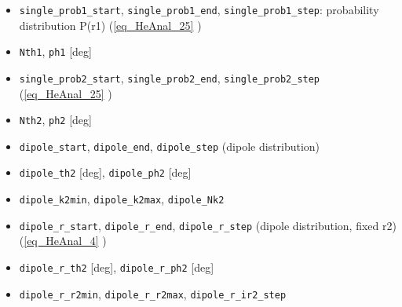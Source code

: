 \begin{itemize}
\item \verb`single_prob1_start`, \verb`single_prob1_end`, \verb`single_prob1_step`: probability distribution P(\vec r1) (\autoref{eq_HeAnal_25} )
\item \verb`Nth1`, \verb`ph1` [deg]

\item \verb`single_prob2_start`, \verb`single_prob2_end`, \verb`single_prob2_step` (\autoref{eq_HeAnal_25} )
\item \verb`Nth2`, \verb`ph2` [deg]

\item \verb`dipole_start`, \verb`dipole_end`, \verb`dipole_step` (dipole distribution)
\item \verb`dipole_th2` [deg], \verb`dipole_ph2` [deg]
\item \verb`dipole_k2min`, \verb`dipole_k2max`, \verb`dipole_Nk2`

\item \verb`dipole_r_start`, \verb`dipole_r_end`, \verb`dipole_r_step` (dipole distribution, fixed r2) (\autoref{eq_HeAnal_4} )
\item \verb`dipole_r_th2` [deg], \verb`dipole_r_ph2` [deg]
\item \verb`dipole_r_r2min`, \verb`dipole_r_r2max`, \verb`dipole_r_ir2_step`
\end{itemize}
